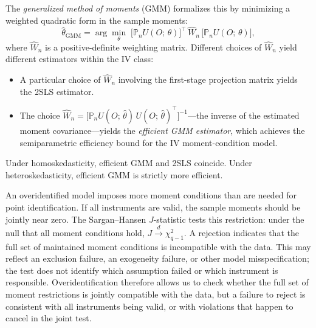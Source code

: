 \documentclass[master.tex]{subfiles}
\begin{document}
The \emph{generalized method of moments} (GMM) formalizes this by
minimizing a weighted quadratic form in the sample moments:
\[
  \hat\theta_{\mathrm{GMM}}
  = \arg\min_{\theta}\;
  \bigl[\mathbb{P}_n U(O;\,\theta)\bigr]^\top\,
  \hat{W}_n\,
  \bigl[\mathbb{P}_n U(O;\,\theta)\bigr],
\]
where $\hat{W}_n$ is a positive-definite weighting matrix.  Different
choices of $\hat{W}_n$ yield different estimators within the IV class:
\begin{itemize}
  \item A particular choice of $\hat{W}_n$ involving the first-stage
    projection matrix yields the 2SLS estimator.
  \item The choice $\hat{W}_n = \bigl[\mathbb{P}_n U(O;\,\hat\theta)\,
    U(O;\,\hat\theta)^\top\bigr]^{-1}$---the inverse of the estimated
    moment covariance---yields the \emph{efficient GMM estimator},
    which achieves the semiparametric efficiency bound for the
    IV moment-condition model.
\end{itemize}
Under homoskedasticity, efficient GMM and 2SLS coincide.  Under
heteroskedasticity, efficient GMM is strictly more efficient.

\begin{remark}
An overidentified model imposes more moment conditions than are
needed for point identification.  If all instruments are valid, the
sample moments should be jointly near zero.  The Sargan--Hansen
$J$-statistic \citep{sargan1958estimation, hansen1982large} tests
this restriction: under the null that all moment conditions hold,
$J \xrightarrow{d} \chi^2_{q-1}$.  A rejection indicates that the
full set of maintained moment conditions is incompatible with the
data.  This may reflect an exclusion failure, an exogeneity failure,
or other model misspecification; the test does not identify which
assumption failed or which instrument is responsible.
Overidentification therefore allows us to check whether the full set
of moment restrictions is jointly compatible with the data, but a
failure to reject is consistent with all instruments being valid, or
with violations that happen to cancel in the joint test.
\end{remark}
\end{document}
